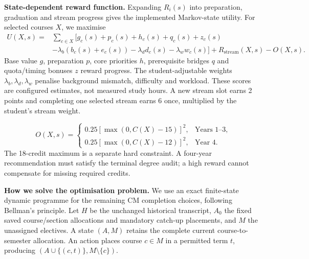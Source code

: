 \documentclass{article}
\begin{document}
\textbf{State-dependent reward function.} Expanding $R_i(s)$ into preparation, graduation and stream progress gives the implemented Markov-state utility. For selected courses $X$, we maximise
\begin{align}
U(X,s)={}&\sum_{c\in X}\bigl[g_c(s)+p_c(s)+h_c(s)+q_c(s)+z_c(s)\nonumber\\
&-\lambda_b(b_c(s)+e_c(s))-\lambda_d d_c(s)-\lambda_w w_c(s)\bigr]
+R_{\mathrm{stream}}(X,s)-O(X,s).\label{eq:utility}
\end{align}
\newpage
Base value $g$, preparation $p$, core priorities $h$, prerequisite bridges $q$ and quota/timing bonuses $z$ reward progress. The student-adjustable weights $\lambda_b,\lambda_d,\lambda_w$ penalise background mismatch, difficulty and workload. These scores are configured estimates, not measured study hours. A new stream slot earns 2 points and completing one selected stream earns 6 once, multiplied by the student's stream weight.

\begin{equation}
O(X,s)=\begin{cases}
0.25[\max(0,C(X)-15)]^2,&\text{Years 1--3},\\
0.25[\max(0,C(X)-12)]^2,&\text{Year 4}.
\end{cases}\label{eq:overload}
\end{equation}
The 18-credit maximum is a separate hard constraint. A four-year recommendation must satisfy the terminal degree audit; a high reward cannot compensate for missing required credits.

\textbf{How we solve the optimisation problem.} We use an exact finite-state dynamic programme for the remaining CM completion choices, following Bellman's principle\citep{dp}. Let $H$ be the unchanged historical transcript, $A_0$ the fixed saved course/section allocations and mandatory catch-up placements, and $M$ the unassigned electives. A state $(A,M)$ retains the complete current course-to-semester allocation. An action places course $c\in M$ in a permitted term $t$, producing $(A\cup\{(c,t)\},M\setminus\{c\})$.
\end{document}
